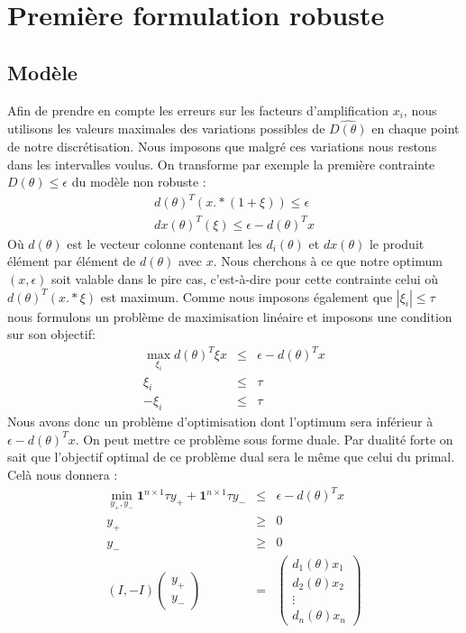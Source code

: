 \section{Première formulation robuste}
\subsection{Modèle}

Afin de prendre en compte les erreurs sur les facteurs d'amplification $x_i$, nous utilisons les valeurs maximales des variations possibles de $\hat{D(\theta)}$ en chaque point de notre discrétisation. Nous imposons que malgré ces variations nous restons dans les intervalles voulus. On transforme par exemple la première contrainte $D(\theta)\leq \epsilon$ du modèle non robuste :
\begin{eqnarray*}
d(\theta)^T (x.*(1+\xi)) \leq \epsilon \\ 
dx(\theta)^T (\xi) \leq \epsilon- d(\theta)^T x
\end{eqnarray*}
Où $d(\theta)$ est le vecteur colonne contenant les $d_i(\theta)$ et $dx(\theta)$ le produit élément par élément de $d(\theta)$ avec $x$.
Nous cherchons à ce que notre optimum $(x,\epsilon)$ soit valable dans le pire cas, c'est-à-dire pour cette contrainte celui où $d(\theta)^T (x.*\xi)$ est maximum. Comme nous imposons également que $|\xi_i|\leq \tau$ nous formulons un problème de maximisation linéaire et imposons une condition sur son objectif: 
\begin{eqnarray*}
\max_{\xi_i} d(\theta)^T\xi x & \leq & \epsilon- d(\theta)^T x \\
\xi_i & \leq & \tau \\
-\xi_i & \leq & \tau 
\end{eqnarray*}
Nous avons donc un problème d'optimisation dont l'optimum sera inférieur à $\epsilon- d(\theta)^T x $. On peut mettre ce problème sous forme duale. Par dualité forte on sait que l'objectif optimal de ce problème dual sera le même que celui du primal. Celà nous donnera :
\begin{eqnarray*}
\min_{y_+,y_-} \mathbf{1}^{n\times 1}\tau y_++\mathbf{1}^{n\times 1}\tau y_- & \leq & \epsilon- d(\theta)^T x \\
y_+ & \geq & 0 \\
y_- & \geq & 0 \\
(I,-I)\begin{pmatrix}
y_+ \\
y_-
\end{pmatrix}
& = & 
\begin{pmatrix}
d_1(\theta)x_1 \\
d_2(\theta)x_2 \\
\vdots \\
d_n(\theta)x_n 
\end{pmatrix}
\end{eqnarray*}
